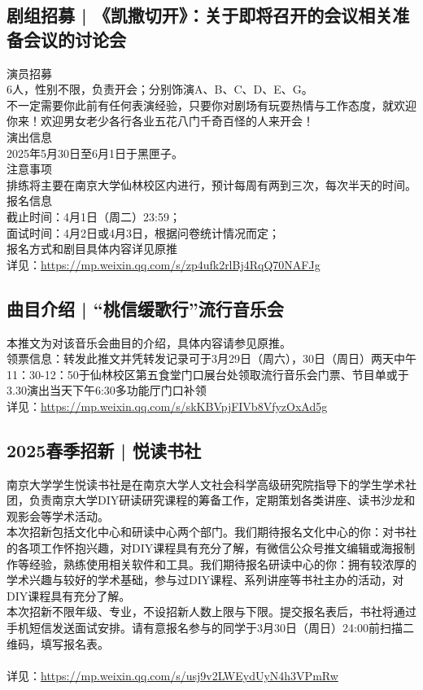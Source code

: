 \documentclass[letterpaper, 12pt]{article}
\begin{document}
\begin{multicols}{2}
\subsection{剧组招募 | 《凯撒切开》：关于即将召开的会议相关准备会议的讨论会}
演员招募
\\6人，性别不限，负责开会；分别饰演A、B、C、D、E、G。
\\不一定需要你此前有任何表演经验，只要你对剧场有玩耍热情与工作态度，就欢迎你来！欢迎男女老少各行各业五花八门千奇百怪的人来开会！
\\演出信息
\\2025年5月30日至6月1日于黑匣子。
\\注意事项
\\排练将主要在南京大学仙林校区内进行，预计每周有两到三次，每次半天的时间。
\\报名信息
\\截止时间：4月1日（周二）23:59；
\\面试时间：4月2日或4月3日，根据问卷统计情况而定；
\\报名方式和剧目具体内容详见原推
\\详见：\url{https://mp.weixin.qq.com/s/zp4ufk2rlBj4RqQ70NAFJg}

\subsection{曲目介绍 | “桃信缓歌行”流行音乐会}
本推文为对该音乐会曲目的介绍，具体内容请参见原推。
\\领票信息：转发此推文并凭转发记录可于3月29日（周六），30日（周日）两天中午11：30-12：50于仙林校区第五食堂门口展台处领取流行音乐会门票、节目单或于3.30演出当天下午6:30多功能厅门口补领
\\详见：\url{https://mp.weixin.qq.com/s/skKBVpjFIVb8VfyzOxAd5g}

\subsection{2025春季招新 | 悦读书社}
南京大学学生悦读书社是在南京大学人文社会科学高级研究院指导下的学生学术社团，负责南京大学DIY研读研究课程的筹备工作，定期策划各类讲座、读书沙龙和观影会等学术活动。
\\本次招新包括文化中心和研读中心两个部门。我们期待报名文化中心的你：对书社的各项工作怀抱兴趣，对DIY课程具有充分了解，有微信公众号推文编辑或海报制作等经验，熟练使用相关软件和工具。我们期待报名研读中心的你：拥有较浓厚的学术兴趣与较好的学术基础，参与过DIY课程、系列讲座等书社主办的活动，对DIY课程具有充分了解。
\\本次招新不限年级、专业，不设招新人数上限与下限。提交报名表后，书社将通过手机短信发送面试安排。请有意报名参与的同学于3月30日（周日）24:00前扫描二维码，填写报名表。
\\
\\详见：\url{https://mp.weixin.qq.com/s/usj9v2LWEydUyN4h3VPmRw}
\end{multicols}
\end{document}
